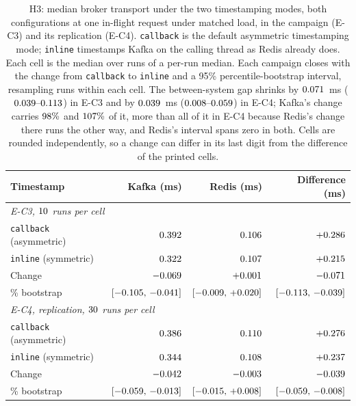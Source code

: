 \documentclass[10pt,journal,onecolumn]{IEEEtran}
\newcommand{\kafka}{Kafka}
\newcommand{\redis}{Redis}
\begin{document}
\begin{table}[t]
\caption{H3: median broker transport under the two timestamping modes, both configurations at one in-flight
request under matched load, in the campaign (E-C3) and its replication (E-C4). \texttt{callback} is the default
asymmetric timestamping mode; \texttt{inline} timestamps \kafka{} on the calling thread as \redis{} already
does. Each cell is the median over runs of a per-run median. Each campaign closes with the change from
\texttt{callback} to \texttt{inline} and a 95\% percentile-bootstrap interval, resampling runs within each
cell. The between-system gap shrinks by $0.071$~ms ($\hThreeShrinkageCI$) in E-C3 and by
$0.039$~ms ($\hThreeRepShrinkageCI$) in E-C4; \kafka{}'s change carries $98\%$ and
$107\%$ of it, more than all of it in E-C4 because \redis{}'s change there runs the other
way, and \redis{}'s interval spans zero in both. Cells are rounded independently,
so a change can differ in its last digit from the difference of the printed cells.}
\label{tab:h3}
\begin{tabular}{lrrr}
\toprule
Timestamp & \kafka{} (ms) & \redis{} (ms) & Difference (ms) \\
\midrule
\multicolumn{4}{l}{\emph{E-C3, $10$ runs per cell}} \\
\texttt{callback} (asymmetric) & $0.392$ & $0.106$ & $+0.286$ \\
\texttt{inline} (symmetric)    & $0.322$ & $0.107$ & $+0.215$ \\
Change                         & $-0.069$ & $+0.001$ & $-0.071$ \\
\quad 95\% bootstrap           & $[\hThreeKafkaChangeCI]$ & $[\hThreeRedisChangeCI]$ & $[\hThreeDiffChangeCI]$ \\
\midrule
\multicolumn{4}{l}{\emph{E-C4, replication, $30$ runs per cell}} \\
\texttt{callback} (asymmetric) & $0.386$ & $0.110$ & $+0.276$ \\
\texttt{inline} (symmetric)    & $0.344$ & $0.108$ & $+0.237$ \\
Change                         & $-0.042$ & $-0.003$ & $-0.039$ \\
\quad 95\% bootstrap           & $[\hThreeRepKafkaChangeCI]$ & $[\hThreeRepRedisChangeCI]$ & $[\hThreeRepDiffChangeCI]$ \\
\bottomrule
\end{tabular}
\end{table}
\end{document}

